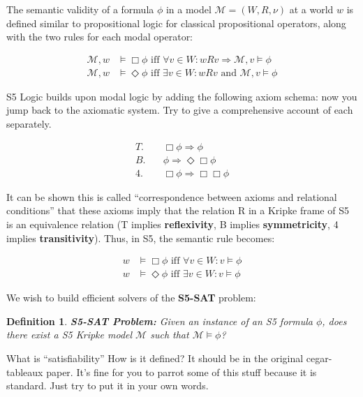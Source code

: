 \documentclass{article}
\newtheorem{definition}{Definition}[section]
\newcommand{\raj}[1]{{\color{blue}#1\color{black}}}
\begin{document}
The semantic validity of a formula $\phi$ in a model $\mathcal{M} = \left(W, R, \nu\right)$ at a world $w$ is defined similar to propositional logic for classical propositional operators, along with the two rules for each modal operator:

\begin{align*}
    \mathcal{M}, w &\vDash \Box \phi \text{ iff } \forall v \in W: wRv \Rightarrow \mathcal{M}, v \vDash \phi \\
    \mathcal{M}, w &\vDash \Diamond \phi \text{ iff } \exists v \in W: wRv \text{ and } \mathcal{M}, v \vDash \phi
\end{align*}

S5 Logic builds upon modal logic by adding the following axiom schema:
\raj{now you jump back to the axiomatic system. Try to give a comprehensive account of each separately.}

\begin{align*}
    T.& \quad \Box \phi \Rightarrow \phi \\
    B.& \quad \phi \Rightarrow \Diamond \Box \phi \\
    4.& \quad \Box \phi \Rightarrow \Box \Box \phi
\end{align*}

It can be shown \raj{this is called ``correspondence between axioms and relational conditions''} that these axioms imply that the relation R in a Kripke frame of S5 is an equivalence relation (T implies \textbf{reflexivity}, B implies \textbf{symmetricity}, 4 implies \textbf{transitivity}). Thus, in S5, the semantic rule becomes:

\begin{align*}
    w &\vDash \Box \phi \text{ iff } \forall v \in W: v \vDash \phi \\
    w &\vDash \Diamond \phi \text{ iff } \exists v \in W: v \vDash \phi
\end{align*}

\noindent We wish to build efficient solvers of the \textbf{S5-SAT} problem:

\begin{definition}
    \textbf{S5-SAT Problem: } Given an instance of an S5 formula $\phi$, does there exist a S5 Kripke model $\mathcal{M}$ such that $\mathcal{M} \vDash \phi$?
\end{definition}

\raj{What is ``satisfiability'' How is it defined? It should be in the original cegar-tableaux paper. It's fine for you to parrot some of this stuff because it is standard. Just try to put it in your own words.}
\end{document}
